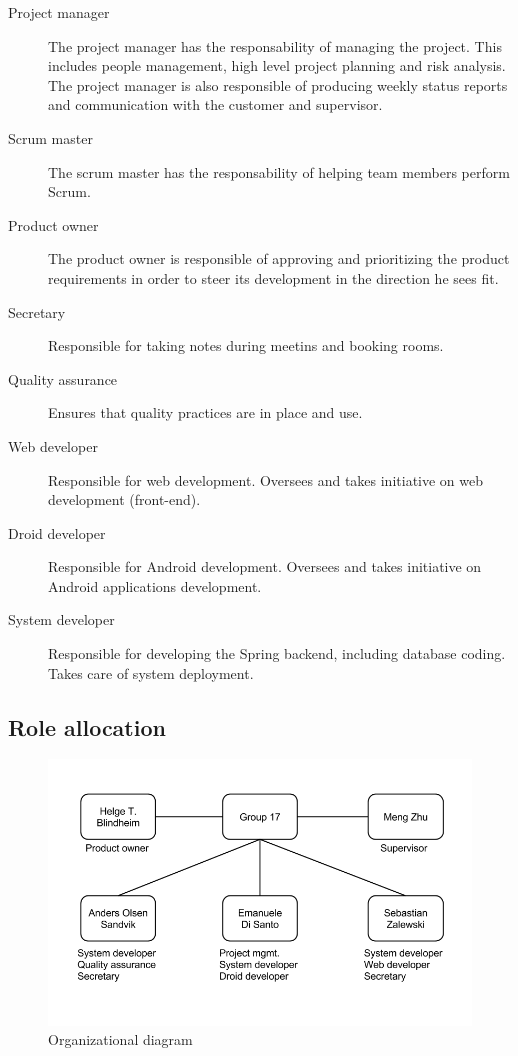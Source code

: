 \begin{description}
\item[Project manager]
The project manager has the responsability of managing the project.
This includes people management, high level project planning and risk analysis.
The project manager is also responsible of producing weekly status reports and communication with the customer and supervisor.
\item[Scrum master]
The scrum master has the responsability of helping team members perform Scrum.
\item[Product owner]
The product owner is responsible of approving and prioritizing the product
requirements in order to steer its development in the direction he sees fit.
\item[Secretary]
Responsible for taking notes during meetins and booking rooms.
\item[Quality assurance]
Ensures that quality practices are in place and use.
\item[Web developer]
Responsible for web development. Oversees and takes initiative on web development (front-end).
\item[Droid developer]
Responsible for Android development. Oversees and takes initiative on Android applications development.
\item[System developer]
Responsible for developing the Spring backend, including database coding. Takes care of system deployment.
\end{description}

\subsection{Role allocation}

\begin{figure}[H]
\includegraphics[scale=0.5]{../Figures/organizational-diagram.png}
\caption{Organizational diagram}
\label{figure:orgdia}
\end{figure}

